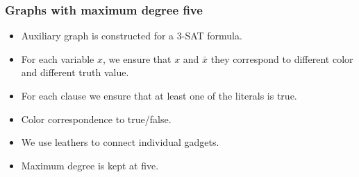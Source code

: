 \documentclass[aspectratio=\myaspectratio]{beamer}
\begin{document}
\begin{frame}
	\frametitle{Graphs with maximum degree five}

	\begin{itemize}
		\item
		      Auxiliary graph is constructed for a 3-SAT formula.
		\item
		      For each variable \( x \),
		      we ensure that \( x \) and \( \bar{x} \)
		      they correspond to different color and different truth value.
		\item
		      For each clause we ensure that at least one of the literals is true.
		\item
		      Color correspondence to true/false.
		\item
		      We use leathers to connect individual gadgets.
		\item
		      Maximum degree is kept at five.
	\end{itemize}
\end{frame}
\end{document}
